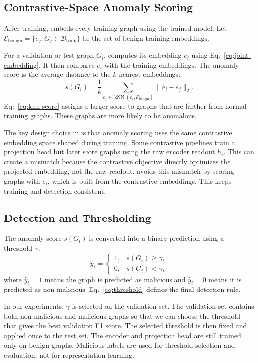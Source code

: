 \subsection{Contrastive-Space Anomaly Scoring}

After training, \sysname{} embeds every training graph using the trained model. Let
$\mathcal{E}_{\text{benign}}=\{e_j : G_j \in \mathcal{B}_{\text{train}}\}$
be the set of benign training embeddings.

For a validation or test graph $G_i$, \sysname{} computes its embedding $e_i$ using Eq.~\eqref{eq:joint-embedding}. It then compares $e_i$ with the training embeddings. The anomaly score is the average distance to the $k$ nearest embeddings:
\begin{equation}
    s(G_i)
    =
    \frac{1}{k}
    \sum_{e_j \in \operatorname{kNN}(e_i,\mathcal{E}_{\text{benign}})}
    \lVert e_i-e_j\rVert_2 .
    \label{eq:knn-score}
\end{equation}
Eq.~\eqref{eq:knn-score} assigns a larger score to graphs that are farther from normal training graphs. These graphs are more likely to be anomalous.

The key design choice in \sysname{} is that anomaly scoring uses the same contrastive embedding space shaped during training. Some contrastive pipelines train a projection head but later score graphs using the raw encoder readout $h_i$. This can create a mismatch because the contrastive objective directly optimizes the projected embedding, not the raw readout. \sysname{} avoids this mismatch by scoring graphs with $e_i$, which is built from the contrastive embeddings. This keeps training and detection consistent.

\subsection{Detection and Thresholding}

The anomaly score $s(G_i)$ is converted into a binary prediction using a threshold $\gamma$:
\begin{equation}
    \hat{y}_i =
    \begin{cases}
    1, & s(G_i) \geq \gamma,\\
    0, & s(G_i) < \gamma,
    \end{cases}
    \label{eq:threshold}
\end{equation}
where $\hat{y}_i=1$ means the graph is predicted as malicious and $\hat{y}_i=0$ means it is predicted as non-malicious. Eq.~\eqref{eq:threshold} defines the final detection rule.

In our experiments, $\gamma$ is selected on the validation set. The validation set contains both non-malicious and malicious graphs so that we can choose the threshold that gives the best validation F1 score. The selected threshold is then fixed and applied once to the test set. The encoder and projection head are still trained only on benign graphs. Malicious labels are used for threshold selection and evaluation, not for representation learning.

